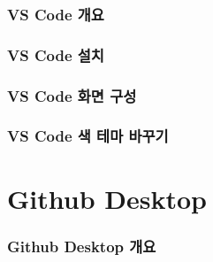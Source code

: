 \documentclass[12pt, a4paper, oneside]{book}
\let\stdsection\section
\renewcommand\section{\newpage\stdsection}
\begin{document}
%										 
	\section 	{VS Code 개요}


%										
	\section{VS Code 설치}



%										
	\section{VS Code 화면 구성}



%										
	\section{VS Code 색 테마 바꾸기}



	\part{Github Desktop}
	\noptcrule
	\minitoc				


%										
	\section{Github Desktop 개요}
\end{document}

